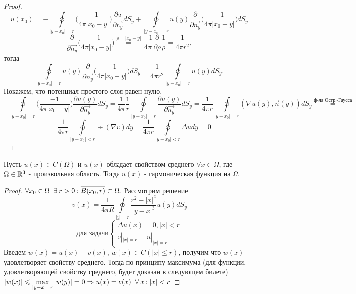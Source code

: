 \begin{proof}
$$u(x_0)= -\oint\limits_{|y-x_0|=r} \bigg( \frac{-1}{4\pi |x_0-y|} \bigg) \frac{\partial u}{\partial \vec{n_y}} dS_y + \oint\limits_{|y-x_0|=r} u(y) \frac{\partial}{\partial \vec{n_y}} \bigg(\frac{-1}{4\pi |x_0-y|}\bigg) dS_y $$
$$\frac{\partial}{\partial \vec{n_y}} \bigg(\frac{-1}{4\pi |x_0-y|}\bigg)\stackrel{\rho = |x_0 - y|}{=} \frac{-1}{4\pi}\frac{\partial}{\partial \rho}\frac{1}{\rho} = \frac{1}{4 \pi r^2},$$ тогда $$\oint\limits_{|y-x_0|=r} u(y) \frac{\partial}{\partial \vec{n_y}} \bigg(\frac{-1}{4\pi |x_0-y|}\bigg) dS_y = \frac{1}{4 \pi r^2} \oint\limits_{|y-x_0|=r} u(y) dS_y.$$
Покажем, что потенциал простого слоя равен нулю.
\[ -\oint\limits_{|y-x_0|=r} \bigg( \frac{-1}{4\pi |x_0-y|} \bigg) \frac{\partial u(y)}{\partial \vec{n_y}} dS_y = \frac{1}{4\pi} \frac{1}{r} \oint\limits_{|y-x_0|=r}  \frac{\partial u(y)}{\partial \vec{n_y}} dS_y = \frac{1}{4\pi r} \oint\limits_{|y-x_0|=r} (\nabla u(y), \vec{n}(y)) dS_y \stackrel{\text{ф-ла Остр.-Гаусса}}{=}
\]
\[
 = \frac{1}{4\pi r} \oint\limits_{|y-x_0|<r} \div(\nabla u) dy = \frac{1}{4\pi r} \oint\limits_{|y-x_0|<r} \Delta u dy  = 0
 \]
\end{proof}
\begin{theorem}
Пусть $u(x) \in C(\Omega)$ и $u(x)$ обладает свойством среднего $\forall x \in \Omega$, где $\Omega \in \mathbb{R}^3$ - произвольная область. Тогда $u(x)$ - гармоническая функция на $\Omega$. 
\end{theorem}
\begin{proof}
$\forall x_0\in\Omega\;\;\exists\: r > 0: \overline{B(x_0, r)}\subset\Omega.$ 
Рассмотрим решение $$v(x) = \frac{1}{4\pi R}\oint\limits_{|y|=r}\frac{r^2-|x|^2}{|y-x|^3}u(y)dS_y $$ 
$$\text{для задачи} \begin{cases}
\Delta u(x) = 0, |x| < r \\
v|_{|x| = r} = u|_{|x| = r}
\end{cases} $$
Введем $w(x) = u(x) - v(x)$, $w(x) \in C(|x| \leq r)$, получим что $w(x)$ удовлетворяет свойству среднего. Тогда по принципу максимума (для функции, удовлетворяющей свойству среднего, будет доказан в следующем билете) $|w(x)| \leqslant \max\limits_{|y-x| = r}|w(y)| = 0  \Rightarrow u(x) = v(x) \;\;\forall\: x\colon |x| < r$
\end{proof}